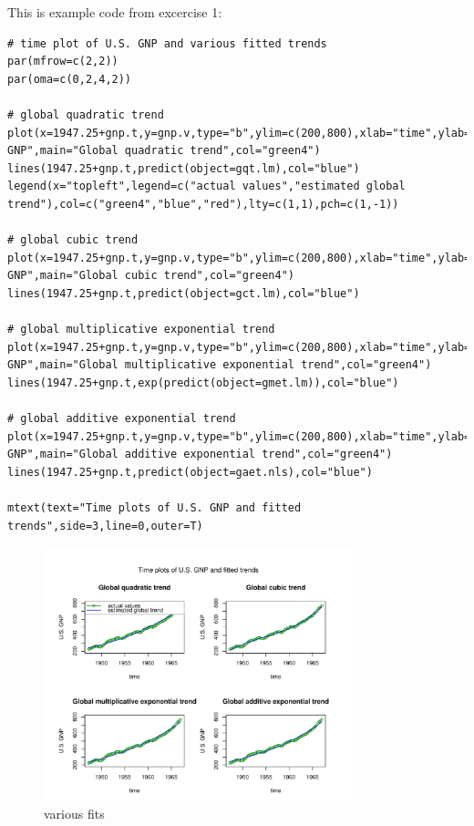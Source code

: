 

This is example code from excercise 1: 

\begin{lstlisting}
# time plot of U.S. GNP and various fitted trends
par(mfrow=c(2,2))
par(oma=c(0,2,4,2))

# global quadratic trend
plot(x=1947.25+gnp.t,y=gnp.v,type="b",ylim=c(200,800),xlab="time",ylab="U.S. GNP",main="Global quadratic trend",col="green4")
lines(1947.25+gnp.t,predict(object=gqt.lm),col="blue")
legend(x="topleft",legend=c("actual values","estimated global trend"),col=c("green4","blue","red"),lty=c(1,1),pch=c(1,-1))

# global cubic trend
plot(x=1947.25+gnp.t,y=gnp.v,type="b",ylim=c(200,800),xlab="time",ylab="U.S. GNP",main="Global cubic trend",col="green4")
lines(1947.25+gnp.t,predict(object=gct.lm),col="blue")

# global multiplicative exponential trend
plot(x=1947.25+gnp.t,y=gnp.v,type="b",ylim=c(200,800),xlab="time",ylab="U.S. GNP",main="Global multiplicative exponential trend",col="green4")
lines(1947.25+gnp.t,exp(predict(object=gmet.lm)),col="blue")

# global additive exponential trend
plot(x=1947.25+gnp.t,y=gnp.v,type="b",ylim=c(200,800),xlab="time",ylab="U.S. GNP",main="Global additive exponential trend",col="green4")
lines(1947.25+gnp.t,predict(object=gaet.nls),col="blue")

mtext(text="Time plots of U.S. GNP and fitted trends",side=3,line=0,outer=T)
\end{lstlisting}

\begin{figure}[ht]
\centering
\includegraphics[width=0.8\textwidth]{plots/Rplot1.pdf}
\caption{various fits}
\end{figure}